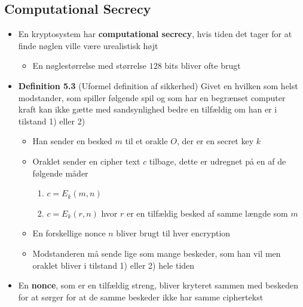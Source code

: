 \documentclass[a4, english]{article}
\begin{document}
\subsection{Computational Secrecy}
\begin{itemize}
	\item En kryptosystem har \textbf{computational secrecy}, hvis tiden det tager for at finde nøglen ville være urealistisk højt
  \begin{itemize}
  	\item En nøglestørrelse med størrelse $128$ bits bliver ofte brugt
  \end{itemize}
  \item \textbf{Definition 5.3} (Uformel definition af sikkerhed)  Givet en hvilken som helst modstander, som spiller følgende spil og som har en begrænset computer kraft kan ikke gætte med sandsynlighed bedre en tilfældig om han er i tilstand 1) eller 2) 
  \begin{itemize}
  	\item Han sender en besked $m$ til et orakle $O$, der er en secret key $k$ 
    \item Oraklet sender en cipher text $c$ tilbage, dette er udregnet på en af de følgende måder
    \begin{enumerate}[label=\arabic{*})]
    	\item $c=E_k(m,n)$ 
      \item $c=E_k(r,n)$ hvor $r$ er en tilfældig besked af samme længde som $m$ 
    \end{enumerate}
    \item En forskellige nonce $n$ bliver brugt til hver encryption
    \item Modstanderen må sende lige som mange beskeder, som han vil men oraklet bliver i tilstand 1) eller 2) hele tiden
  \end{itemize}
  \item En \textbf{nonce}, som er en tilfældig streng, bliver kryteret sammen med beskeden for at sørger for at de samme beskeder ikke har samme ciphertekst

\end{itemize}
\end{document}
